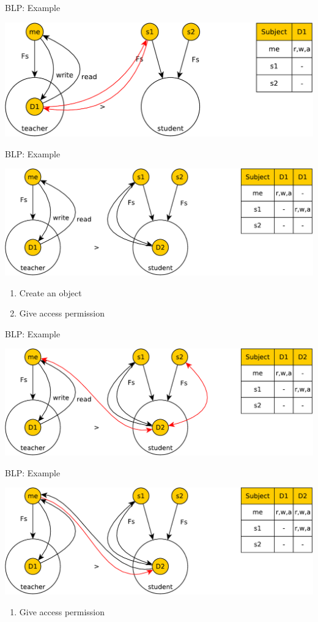 \documentclass{beamer}
\begin{document}
\begin{frame}[t]{BLP: Example}
  \begin{center}
    \includegraphics[width=0.8\linewidth]{ex5}
  \end{center}
\end{frame}
\begin{frame}[t]{BLP: Example}
  \begin{center}
    \includegraphics[width=0.9\linewidth]{ex6}
  \end{center}
\begin{enumerate}
  \item Create an object
  \item Give access permission
\end{enumerate}
\end{frame}
\begin{frame}[t]{BLP: Example}
  \begin{center}
    \includegraphics[width=0.9\linewidth]{ex7}
  \end{center}
\end{frame}

\begin{frame}[t]{BLP: Example}
  \begin{center}
    \includegraphics[width=0.8\linewidth]{ex8}
  \end{center}
\begin{enumerate}
  \item Give access permission
\end{enumerate}
\end{frame}
\end{document}
